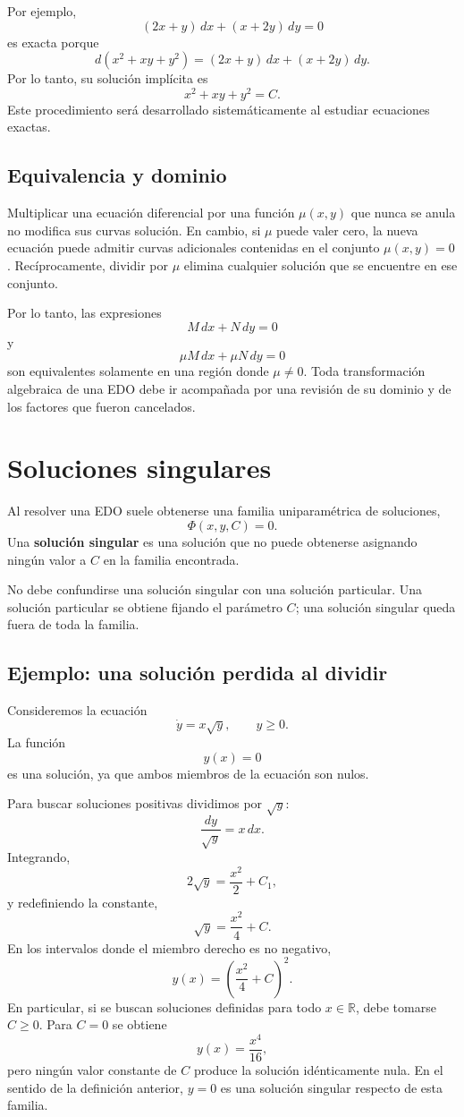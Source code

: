 \documentclass[12pt,a4paper]{article}
\begin{document}
	Por ejemplo,
	\[
	(2x+y)\,dx+(x+2y)\,dy=0
	\]
es exacta porque
	\[
	d\left(x^2+xy+y^2\right)
	=
	(2x+y)\,dx+(x+2y)\,dy.
	\]
Por lo tanto, su solución implícita es
	\[
	x^2+xy+y^2=C.
	\]
Este procedimiento será desarrollado sistemáticamente al estudiar ecuaciones exactas.

	\subsection{Equivalencia y dominio}

	Multiplicar una ecuación diferencial por una función $\mu(x,y)$ que nunca se anula no modifica sus curvas solución. En cambio, si $\mu$ puede valer cero, la nueva ecuación puede admitir curvas adicionales contenidas en el conjunto $\mu(x,y)=0$. Recíprocamente, dividir por $\mu$ elimina cualquier solución que se encuentre en ese conjunto.

	Por lo tanto, las expresiones
	\[
	M\,dx+N\,dy=0
	\]
y
	\[
	\mu M\,dx+\mu N\,dy=0
	\]
son equivalentes solamente en una región donde $\mu\neq 0$. Toda transformación algebraica de una EDO debe ir acompañada por una revisión de su dominio y de los factores que fueron cancelados.

	\clearpage
	\section{Soluciones singulares}

	Al resolver una EDO suele obtenerse una familia uniparamétrica de soluciones,
	\[
	\Phi(x,y,C)=0.
	\]
Una \textbf{solución singular} es una solución que no puede obtenerse asignando ningún valor a \(C\) en la familia encontrada.

	No debe confundirse una solución singular con una solución particular. Una solución particular se obtiene fijando el parámetro \(C\); una solución singular queda fuera de toda la familia.

	\subsection{Ejemplo: una solución perdida al dividir}

	Consideremos la ecuación
	\[
	\dot{y}=x\sqrt{y},
	\qquad y\geq 0.
	\]
La función
	\[
	y(x)=0
	\]
es una solución, ya que ambos miembros de la ecuación son nulos.

	Para buscar soluciones positivas dividimos por \(\sqrt{y}\):
	\[
	\frac{dy}{\sqrt{y}}=x\,dx.
	\]
Integrando,
	\[
	2\sqrt{y}=\frac{x^2}{2}+C_1,
	\]
y redefiniendo la constante,
	\[
	\sqrt{y}=\frac{x^2}{4}+C.
	\]
En los intervalos donde el miembro derecho es no negativo,
	\[
	y(x)=\left(\frac{x^2}{4}+C\right)^2.
	\]
En particular, si se buscan soluciones definidas para todo \(x\in\mathbb{R}\), debe tomarse \(C\geq 0\). Para \(C=0\) se obtiene
	\[
	y(x)=\frac{x^4}{16},
	\]
pero ningún valor constante de \(C\) produce la solución idénticamente nula. En el sentido de la definición anterior, \(y=0\) es una solución singular respecto de esta familia.
\end{document}
